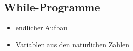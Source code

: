 \documentclass{lehramt-informatik-haupt}
\begin{document}
\subsection{While-Programme}

\begin{liQuellen}
\item \cite[Seite 7-12]{theo:fs:4}
\item \cite[Seite 260-264]{hoffmann}
\item \cite{wiki:while}
\end{liQuellen}

\begin{itemize}
\item endlicher Aufbau
\item Variablen aus den natürlichen Zahlen
\end{itemize}
\end{document}
